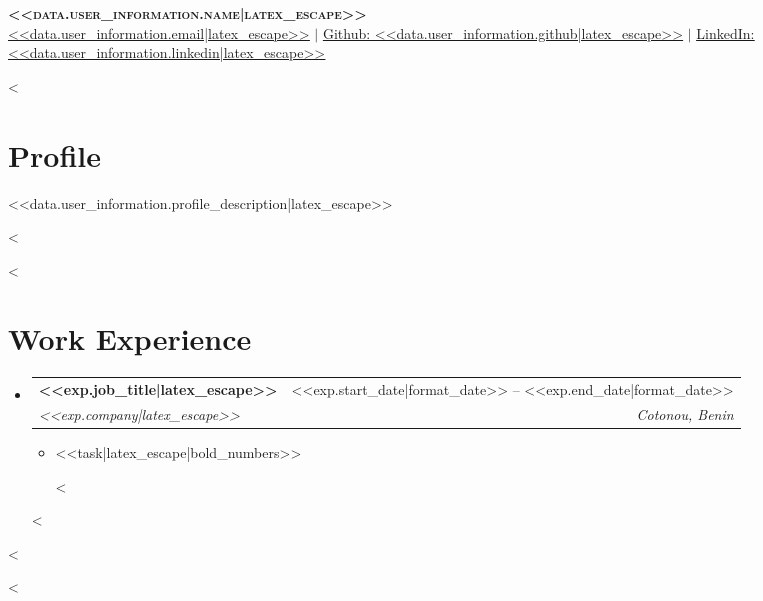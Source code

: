 \documentclass[letterpaper,11pt]{article}
\makeatletter
\newcommand{\resumeItem}[1]{
  \item\small{
    {#1 \vspace{-2pt}}
  }
}
\newcommand{\resumeSubheading}[4]{
  \vspace{-2pt}\item
    \begin{tabular*}{0.97\textwidth}[t]{l@{\extracolsep{\fill}}r}
      \textbf{#1} & #2 \\
      \textit{\small#3} & \textit{\small #4} \\
    \end{tabular*}\vspace{-7pt}
}
\newcommand{\resumeSubHeadingListStart}{\begin{itemize}[leftmargin=0.15in, label={}]}
\newcommand{\resumeSubHeadingListEnd}{\end{itemize}}
\newcommand{\resumeItemListStart}{\begin{itemize}}
\newcommand{\resumeItemListEnd}{\end{itemize}\vspace{-5pt}}
\makeatother
\begin{document}
\begin{center}
    \textbf{\Huge \scshape <<data.user_information.name|latex_escape>>} \\ \vspace{1pt}
    \href{mailto:<<data.user_information.email|latex_escape>>}{\underline{<<data.user_information.email|latex_escape>>}} $|$
    \href{https://github.com/<<data.user_information.github|latex_escape>>}{\underline{Github: <<data.user_information.github|latex_escape>>}} $|$
    \href{https://www.linkedin.com/in/<<data.user_information.linkedin|latex_escape|lower|replace(" ", "-")>>}{\underline{LinkedIn: <<data.user_information.linkedin|latex_escape>>}}
\end{center}

<%
\section{Profile}
 \begin{itemize}[leftmargin=0.15in, label={}]
    \small{\item{
     <<data.user_information.profile_description|latex_escape>>
    }}
 \end{itemize}
<%

<%
\section{Work Experience}
  \resumeSubHeadingListStart
    <%
    \resumeSubheading
      {<<exp.job_title|latex_escape>>}{<<exp.start_date|format_date>> -- <<exp.end_date|format_date>>}
      {<<exp.company|latex_escape>>}{Cotonou, Benin}
      \resumeItemListStart
        <%
        \resumeItem{<<task|latex_escape|bold_numbers>>}
        <%
      \resumeItemListEnd
    <%
  \resumeSubHeadingListEnd
<%

<%
\end{document}
